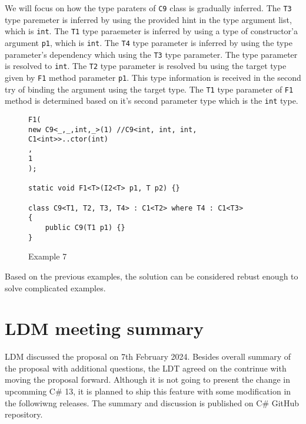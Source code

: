 We will focus on how the type paraters of \texttt{C9} class is gradually inferred.
The \texttt{T3} type paremeter is inferred by using the provided hint in the type argument list, which is \texttt{int}.
The \texttt{T1} type paraemeter is inferred by using a type of constructor'a argument \texttt{p1}, which is \texttt{int}.
The \texttt{T4} type parameter is inferred by using the type parameter's dependency which using the \texttt{T3} type parameter.
The type parameter is resolved to \texttt{int}.
The \texttt{T2} type parameter is resolved bu using the target type given by \texttt{F1} method parameter \texttt{p1}.
This type information is received in the second try of binding the argument using the target type.
The \texttt{T1} type parameter of \texttt{F1} method is determined based on it's second parameter type which is the \texttt{int} type.
\begin{figure}[h]
\begin{lstlisting}[style=csharp, showstringspaces=false]
F1(
new C9<_,_,int,_>(1) //C9<int, int, int, C1<int>>..ctor(int)
,
1
);

static void F1<T>(I2<T> p1, T p2) {}

class C9<T1, T2, T3, T4> : C1<T2> where T4 : C1<T3>
{
    public C9(T1 p1) {}
}
\end{lstlisting}
\caption{Example 7}
\label{img79:example7}
\end{figure}
\par
Based on the previous examples, the solution can be considered rebust enough to solve complicated examples.

\section{LDM meeting summary}

\ac{LDM} discussed the proposal on 7th February 2024.
Besides overall summary of the proposal with additional questions, the \ac{LDT} agreed on the contrinue with moving the proposal forward.
Although it is not going to present the change in upcomming C\# 13, it is planned to ship this feature with some modification in the followiwng releases.
The summary \cite{online:mettingSummary} and discussion \cite{online:mettingSummaryDisc} is published on C\# GitHub repository.